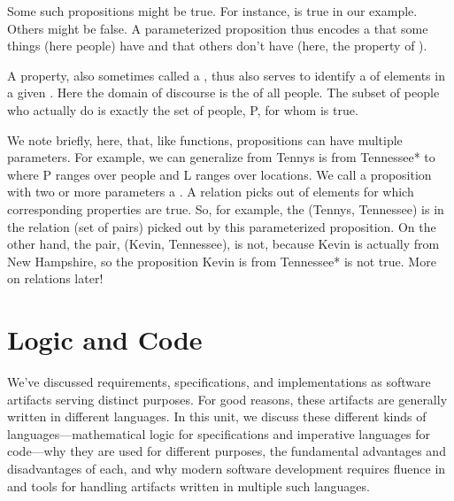 \documentclass[letterpaper,10pt,english]{sphinxmanual}
\begin{document}
Some such propositions might be true. For instance,
 is true in our example. Others might be false. A
parameterized proposition thus encodes a  that some things
(here people) have and that others don’t have (here, the property of
).

A property, also sometimes called a , thus also serves to
identify a  of elements in a given . Here
the domain of discourse is the of all people. The subset of people who
actually do  is exactly the set of people, P, for whom
 is true.

We note briefly, here, that, like functions, propositions can have
multiple parameters. For example, we can generalize from  Tennys is from Tennessee* to  where P ranges over people and L ranges over locations. We
call a proposition with two or more parameters a . A
relation picks out  of elements for which corresponding
properties are true. So, for example, the  (Tennys, Tennessee)
is in the relation (set of  pairs) picked out by this
parameterized proposition. On the other hand, the pair, (Kevin,
Tennessee), is not, because Kevin is actually from New Hampshire, so
the proposition  Kevin is from Tennessee*
is not true. More on relations later!


\chapter{Logic and Code}
\label{\detokenize{02-logic-and-code:logic-and-code}}\label{\detokenize{02-logic-and-code::doc}}
We’ve discussed requirements, specifications, and implementations as
software artifacts serving distinct purposes. For good reasons, these
artifacts are generally written in different languages. In this unit,
we discuss these different kinds of languages—mathematical logic for
specifications and imperative languages for code—why they are used
for different purposes, the fundamental advantages and disadvantages
of each, and why modern software development requires fluence in and
tools for handling artifacts written in multiple such languages.
\end{document}

